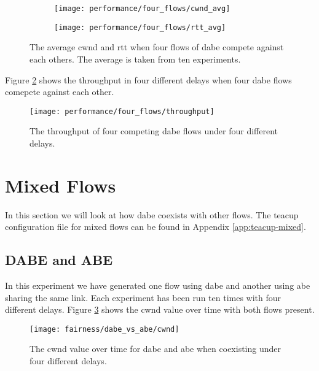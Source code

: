 \begin{figure}[H]
    \centering
    \begin{subfigure}{0.5\linewidth}
        \centering
        \texttt{[image: performance/four\_flows/cwnd\_avg]}
    \end{subfigure}%
    \begin{subfigure}{0.5\linewidth}
        \centering
        \texttt{[image: performance/four\_flows/rtt\_avg]}
    \end{subfigure}
    \caption{The average \gls{cwnd} and \gls{rtt} when four flows of \gls{dabe} compete against each others. The average is taken from ten experiments.}
    \label{fig:dabe_vs_dabe4_avg}
\end{figure}

Figure \ref{fig:dabe_vs_dabe4_throughput} shows the throughput in four different delays when four \gls{dabe} flows comepete against each other.

\begin{figure}[H]
    \centering
    \texttt{[image: performance/four\_flows/throughput]}
    \captionsetup{width=1.0\linewidth}
    \caption{The throughput of four competing \gls{dabe} flows under four different delays.}
    \label{fig:dabe_vs_dabe4_throughput}
\end{figure}






\section{Mixed Flows} \label{sec:mixed-flows}

In this section we will look at how \gls{dabe} coexists with other flows. The \gls{teacup} configuration file for mixed flows can be found in Appendix \ref{app:teacup-mixed}.


\subsection{DABE and ABE}

In this experiment we have generated one flow using \gls{dabe} and another using \gls{abe} sharing the same link. Each experiment has been run ten times with four different delays. Figure \ref{fig:dabe_and_abe_cwnd} shows the \gls{cwnd} value over time with both flows present.

\begin{figure}[H]
    \centering
    \texttt{[image: fairness/dabe\_vs\_abe/cwnd]}
    \captionsetup{width=1.0\linewidth}
    \caption{The \gls{cwnd} value over time for \gls{dabe} and \gls{abe} when coexisting under four different delays.}
    \label{fig:dabe_and_abe_cwnd}
\end{figure}

